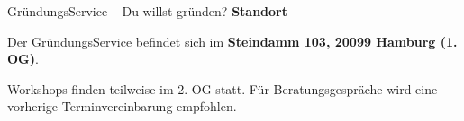 \begin{initiativkarte}{GründungsService – Du willst gründen?}
  \textbf{Standort}

  Der GründungsService befindet sich im \textbf{Steindamm 103, 20099 Hamburg (1. OG)}.

  Workshops finden teilweise im 2. OG statt. Für Beratungsgespräche wird eine vorherige Terminvereinbarung empfohlen.

  \vspace{0.5cm}


  \vspace{0.6cm}
  \hawrule


\end{initiativkarte}